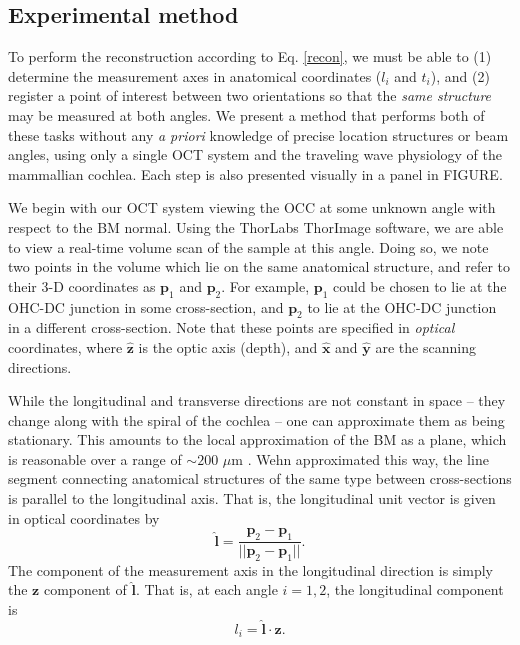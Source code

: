 \documentclass[preprint,NumberedRefs]{JASA}
\begin{document}
\subsection{Experimental method}
\par{To perform the reconstruction according to Eq. \ref{recon}, we must be able to (1) determine the measurement axes in anatomical coordinates ($l_i$ and $t_i$), and (2) register a point of interest between two orientations so that the \textit{same structure} may be measured at both angles. We present a method that performs both of these tasks without any \textit{a priori} knowledge of precise location structures or beam angles, using only a single OCT system and the traveling wave physiology of the mammallian cochlea. Each step is also presented visually in a panel in FIGURE.}
\par{We begin with our OCT system viewing the OCC at some unknown angle with respect to the BM normal. Using the ThorLabs ThorImage software, we are able to view a real-time volume scan of the sample at this angle. Doing so, we note two points in the volume which lie on the same anatomical structure, and refer to their 3-D coordinates as $\mathbf{p}_1$ and $\mathbf{p}_2$. For example, $\mathbf{p}_1$ could be chosen to lie at the OHC-DC junction in some cross-section, and $\mathbf{p}_2$ to lie at the OHC-DC junction in a different cross-section. Note that these points are specified in \textit{optical} coordinates, where $\mathbf{\hat{z}}$ is the optic axis (depth), and $\mathbf{\hat{x}}$ and $\mathbf{\hat{y}}$ are the scanning directions.}
\par{While the longitudinal and transverse directions are not constant in space -- they change along with the spiral of the cochlea -- one can approximate them as being stationary. This amounts to the local approximation of the BM as a plane, which is reasonable over a range of $\sim 200$ $\mu$m \citep{frost2022}. Wehn approximated this way, the line segment connecting anatomical structures of the same type between cross-sections is parallel to the longitudinal axis. That is, the longitudinal unit vector is given in optical coordinates by
\begin{equation}
	\mathbf{\hat{l}} = \frac{\mathbf{p}_2-\mathbf{p}_1}{||\mathbf{p}_2-\mathbf{p}_1||}.
\end{equation}
The component of the measurement axis in the longitudinal direction is simply the $\mathbf{z}$ component of $\mathbf{\hat{l}}$. That is, at each angle $i=1,2$, the longitudinal component is
\begin{equation}
	l_i = \mathbf{\hat{l}}\cdot\mathbf{z}.
\end{equation}
}
\end{document}
